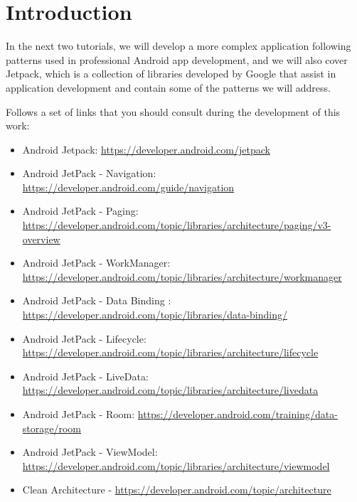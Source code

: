 \documentclass[a4paper, 12pt]{article}
\begin{document}
	
	



\section{Introduction}

\justify

In the next two tutorials, we will develop a more complex application following patterns used in professional Android app development,
and we will also cover Jetpack, which is a collection of libraries developed by Google that assist in application development and contain some of the patterns we will address.

Follows a set of links that you should consult during the development of this work:

\begin{itemize}
	\item Android Jetpack: \url{https://developer.android.com/jetpack}
	\item Android JetPack - Navigation: \url{https://developer.android.com/guide/navigation}
	\item Android JetPack - Paging: \url{https://developer.android.com/topic/libraries/architecture/paging/v3-overview}
	\item Android JetPack - WorkManager: \url{https://developer.android.com/topic/libraries/architecture/workmanager}
	\item Android JetPack - Data Binding : \url{https://developer.android.com/topic/libraries/data-binding/}
	\item Android JetPack - Lifecycle: \url{https://developer.android.com/topic/libraries/architecture/lifecycle}
	\item Android JetPack - LiveData: \url{https://developer.android.com/topic/libraries/architecture/livedata}
	\item Android JetPack - Room: \url{https://developer.android.com/training/data-storage/room}
	\item Android JetPack - ViewModel: \url{https://developer.android.com/topic/libraries/architecture/viewmodel}
	\item Clean Architecture - \url{https://developer.android.com/topic/architecture}
\end{itemize}

\end{document}
